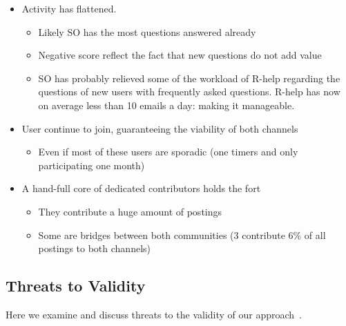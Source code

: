 \documentclass[smallextended]{svjour3}       %
\newcommand{\RH}{R-help\xspace}
\begin{document}
\begin{itemize}
\item Activity has flattened.
  \begin{itemize}
  \item Likely SO has the most questions answered already
  \item Negative score reflect the fact that new questions do not add value
  \item SO has probably relieved some of the workload of \RH regarding the questions of new users with frequently asked questions. 
   \RH has now on average less than 10 emails a day: making it manageable.
  \end{itemize}
\item User continue to join, guaranteeing the viability of both channels
  \begin{itemize}
  \item Even if most of these users are sporadic (one timers and only participating one month)
  \end{itemize}
\item A hand-full core of dedicated contributors holds the fort
  \begin{itemize}
  \item They contribute a huge amount of postings
  \item Some are bridges between both communities (3 contribute 6\% of all postings to both channels)
  \end{itemize}
\end{itemize}


\subsection{Threats to Validity}
\label{cha:threats}
Here we examine and discuss threats to the validity of our approach~\cite{Runeson2012}.
\end{document}
